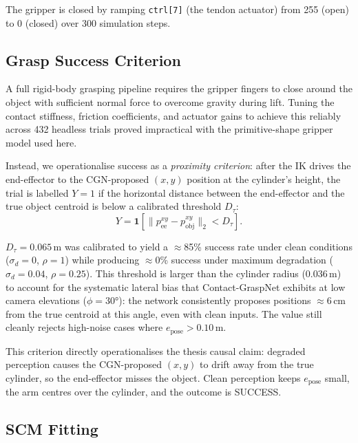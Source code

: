 \documentclass[journal]{IEEEtran}
\begin{document}
The gripper is closed by ramping \texttt{ctrl[7]} (the tendon
actuator) from 255 (open) to 0 (closed) over 300 simulation steps.

\subsection{Grasp Success Criterion}
\label{sec:success_criterion}

A full rigid-body grasping pipeline requires the gripper fingers to
close around the object with sufficient normal force to overcome
gravity during lift.  Tuning the contact stiffness, friction
coefficients, and actuator gains to achieve this reliably across 432
headless trials proved impractical with the primitive-shape gripper
model used here.

Instead, we operationalise success as a \emph{proximity criterion}:
after the IK drives the end-effector to the CGN-proposed $(x,y)$
position at the cylinder's height, the trial is labelled
$Y{=}1$ if the horizontal distance between the end-effector and the
true object centroid is below a calibrated threshold $D_{\tau}$:
\begin{equation}
  Y = \mathbf{1}\!\left[
    \|p_{\text{ee}}^{xy} - p_{\text{obj}}^{xy}\|_2 < D_\tau
  \right].
  \label{eq:success}
\end{equation}

$D_\tau = 0.065$\,m was calibrated to yield a $\approx$85\% success
rate under clean conditions ($\sigma_d = 0$, $\rho = 1$) while
producing $\approx$0\% success under maximum degradation
($\sigma_d = 0.04$, $\rho = 0.25$).  This threshold is larger than
the cylinder radius (0.036\,m) to account for the systematic
lateral bias that Contact-GraspNet exhibits at low camera elevations
($\phi = 30°$): the network consistently proposes positions
$\approx$6\,cm from the true centroid at this angle, even with clean
inputs.  The value still cleanly rejects high-noise cases where
$e_{\text{pose}} > 0.10$\,m.

This criterion directly operationalises the thesis causal claim:
degraded perception causes the CGN-proposed $(x,y)$ to drift away
from the true cylinder, so the end-effector misses the object.
Clean perception keeps $e_{\text{pose}}$ small, the arm centres
over the cylinder, and the outcome is SUCCESS.

\subsection{SCM Fitting}
\end{document}
